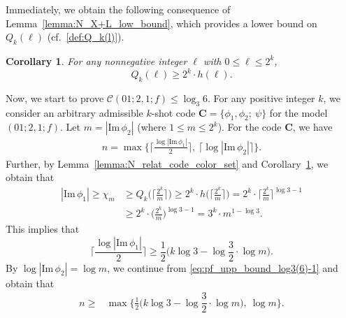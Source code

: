 \documentclass[11pt,draftclsnofoot,onecolumn]{IEEEtran}
\newtheorem{cor}{Corollary}
\newtheorem{remark}{Remark}
\newcommand{\mbC}{\mathbf{C}}
\def\Im{\mathrm{Im}}
\begin{document}
Immediately, we obtain the following consequence  of Lemma~\ref{lemma:N_X+L_low_bound}, which provides a lower bound on~$Q_{k}(\ell)$ (cf.~\eqref{def:Q_k(l)}).

\begin{cor}\label{cor:Q_k^l_low_bound}
For any nonnegative integer $\ell$ with $0\leq \ell\leq 2^{k}$,
\begin{equation*}
Q_{k}(\ell)\geq 2^{k}\cdot h(\ell).
\end{equation*}
\end{cor}
Now, we start to prove $\mathcal{C}(01;2,1;f)\leq \log_{3}6$.
For any positive integer $k$, we consider
 an arbitrary  admissible $k$-shot code  $\mbC=\big\{\phi_1,\phi_2;~\psi\big\}$  for the model $(01;2,1;f)$. Let $m=|\Im\, \phi_{2}|$ (where $1\leq m\leq 2^{k}$).
 For the code $\mbC$,
 we have
\begin{align}
n=\max\bigg\{\bigg\lceil\frac{\log|\Im\,\phi_{1}|}{2}\bigg\rceil,~
\Big\lceil\log|\Im\,\phi_{2}|\Big\rceil\bigg\}.\label{eq:pf_upp_bound_log3(6)-1}
\end{align}
Further, by Lemma~\ref{lemma:N_relat_code_color_set} and Corollary~\ref{cor:Q_k^l_low_bound},
we obtain that
	\begin{align}
		|\Im\, \phi_{1}| \geq
\chi_{m} & \geq Q_{k}\Big(\Big\lceil\frac{2^{k}}{m}\Big\rceil\Big)\geq 2^{k}\cdot h\Big( \Big\lceil\frac{2^{k}}{m}\Big\rceil\Big)
 =2^{k}\cdot \Big\lceil\frac{2^{k}}{m}\Big\rceil^{\log 3-1}
\nonumber\\
&\geq2^{k}\cdot \Big(\frac{2^{k}}{m}\Big)^{\log 3-1}=3^k\cdot m^{1-\log3}.\nonumber%
	\end{align}
This implies that
\begin{equation*}
\bigg\lceil\frac{\log|\Im\,\phi_{1}|}{2}\bigg\rceil \geq \dfrac{1}{2}\Big(k\log3-\log\frac{3}{2}\cdot\log m\Big).\label{eq:pf_upp_bound_log3(6)-4}
\end{equation*}
By $\log|\Im\,\phi_{2}|=\log m$, we continue from \eqref{eq:pf_upp_bound_log3(6)-1} and obtain that
\begin{align}
n\geq&\max\Big\{\frac{1}{2}\Big(k\log3-\log\dfrac{3}{2}\cdot\log m\Big),~\log m\Big\}.\nonumber%
\end{align}
\end{document}
